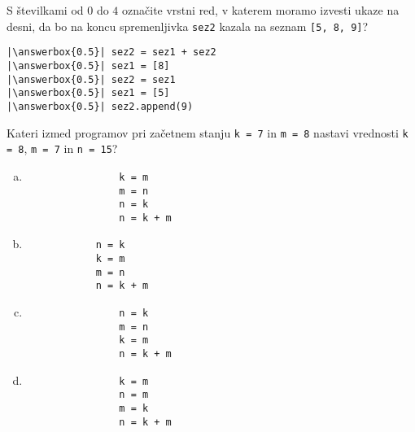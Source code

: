 \documentclass[arhiv, 10pt]{../izpit}
\newcommand{\inlinepy}[1]{\texttt{#1}}
\newcommand{\answerbox}[1]{\framebox{\vphantom{\large M}\hspace{#1cm}}}
\begin{document}
        \naloga*
        \begin{multicols}{2}
        \noindent 
        S številkami od $0$ do $4$ označite vrstni red, v katerem moramo izvesti ukaze na desni, da bo na koncu spremenljivka \inlinepy{sez2} kazala na seznam \inlinepy{[5, 8, 9]}?
    
        \columnbreak
        \noindent
        \begin{verbatim}
|\answerbox{0.5}| sez2 = sez1 + sez2
|\answerbox{0.5}| sez1 = [8]
|\answerbox{0.5}| sez2 = sez1
|\answerbox{0.5}| sez1 = [5]
|\answerbox{0.5}| sez2.append(9)

        \end{verbatim}
        \end{multicols}
    
            
        \naloga*
        
        Kateri izmed programov pri začetnem stanju
            \inlinepy{k = 7} in
            \inlinepy{m = 8}
        nastavi vrednosti
            \inlinepy{k = 8},
            \inlinepy{m = 7} in
            \inlinepy{n = 15}?
    
        \begin{multicols}{4}
        \begin{enumerate}[(a)]
\item 
                \begin{verbatim}
                k = m
                m = n
                n = k
                n = k + m
                \end{verbatim}
            
\item 
            \begin{verbatim}
            n = k
            k = m
            m = n
            n = k + m
            \end{verbatim}
        
\item 
                \begin{verbatim}
                n = k
                m = n
                k = m
                n = k + m
                \end{verbatim}
            
\item 
                \begin{verbatim}
                k = m
                n = m
                m = k
                n = k + m
                \end{verbatim}
            
\end{enumerate}

        \end{multicols}
    
\end{document}
